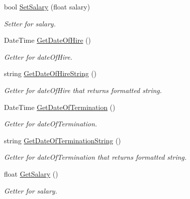 \begin{DoxyCompactItemize}
bool \hyperlink{class_all_employees_1_1_fulltime_employee_accdd74311a5e97d8beb57d68bd88f95c}{Set\+Salary} (float salary)
\begin{DoxyCompactList}\small\item\em Setter for salary. \end{DoxyCompactList}\item 
Date\+Time \hyperlink{class_all_employees_1_1_fulltime_employee_a3a975ad60176797d1d5529e257596565}{Get\+Date\+Of\+Hire} ()
\begin{DoxyCompactList}\small\item\em Getter for date\+Of\+Hire. \end{DoxyCompactList}\item 
string \hyperlink{class_all_employees_1_1_fulltime_employee_a91b4f15454d92eb7cd33968573050ef0}{Get\+Date\+Of\+Hire\+String} ()
\begin{DoxyCompactList}\small\item\em Getter for date\+Of\+Hire that returns formatted string. \end{DoxyCompactList}\item 
Date\+Time \hyperlink{class_all_employees_1_1_fulltime_employee_a97af3da9151f97e91543d60b6b67a4fa}{Get\+Date\+Of\+Termination} ()
\begin{DoxyCompactList}\small\item\em Getter for date\+Of\+Termination. \end{DoxyCompactList}\item 
string \hyperlink{class_all_employees_1_1_fulltime_employee_a7d0612eba21e83226bb09a174179847c}{Get\+Date\+Of\+Termination\+String} ()
\begin{DoxyCompactList}\small\item\em Getter for date\+Of\+Termination that returns formatted string. \end{DoxyCompactList}\item 
float \hyperlink{class_all_employees_1_1_fulltime_employee_a919105156f70d21baa1f3ce5f4d160ee}{Get\+Salary} ()
\begin{DoxyCompactList}\small\item\em Getter for salary. \end{DoxyCompactList}\end{DoxyCompactItemize}
